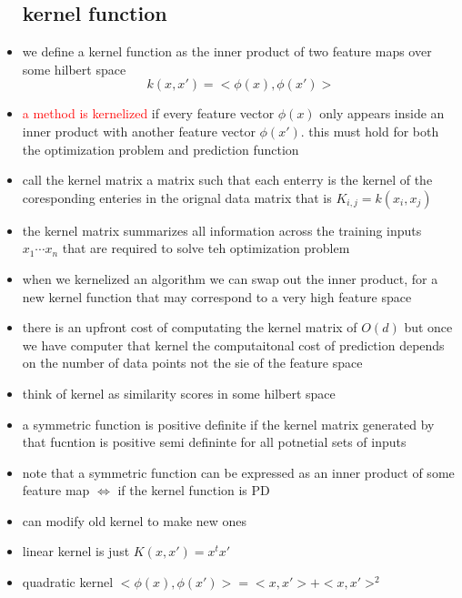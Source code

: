 \documentclass{article}
\begin{document}
\begin{itemize}
\subsection*{kernel function}
\item we define a kernel function as the inner product of two feature maps over some hilbert space $$k(x,x')=<\phi(x),\phi(x')>$$
\item \textcolor{red}{a method is kernelized} if every feature vector $\phi(x)$  only appears inside an inner product with another feature vector $\phi(x')$. this must hold for both the optimization problem and prediction function
\item call the kernel matrix a matrix such that each enterry is the kernel of the coresponding enteries in the orignal data matrix that is $K_{i,j}=k(x_i,x_j)$
\item the kernel matrix summarizes all information across the training inputs $x_1\cdots x_n$ that are required to solve teh optimization problem
\item when we kernelized an algorithm we can swap out the inner product, for a new kernel function that may correspond to a very high feature space
\item there is an upfront cost of computating the kernel matrix of $O(d)$ but once we have computer that kernel the computaitonal cost of prediction depends on the number of data points not the sie of the feature space
\item think of kernel as similarity scores in some hilbert space 
\item a symmetric function is positive definite if the kernel matrix generated by that fucntion is positive semi defininte for all potnetial sets of inputs
\item note that a symmetric function can be expressed as an inner product of some feature map $\iff$ if the kernel function is PD
\item can modify old kernel to make new ones 
\item linear kernel is just $K(x,x')=x^{t}x'$
\item quadratic kernel $<\phi(x), \phi(x')>=<x,x'>+<x,x'>^{2}$ 

\end{itemize}
\end{document}
